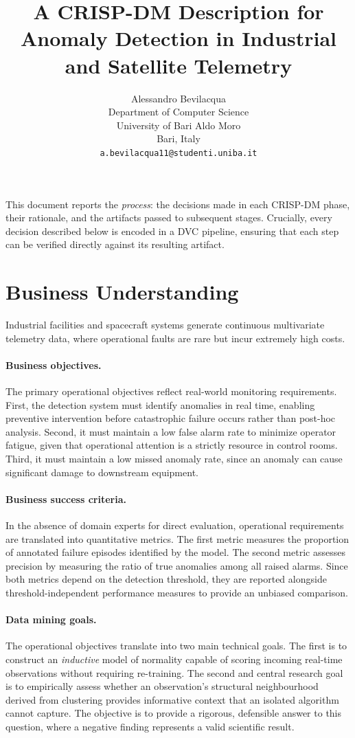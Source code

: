 \documentclass{article}
\title{A CRISP-DM Description for Anomaly Detection in Industrial and Satellite Telemetry}
\author{
 Alessandro Bevilacqua \\
  Department of Computer Science \\
  University of Bari Aldo Moro \\
  Bari, Italy \\
  \texttt{a.bevilacqua11@studenti.uniba.it} \\
}
\begin{document}
\maketitle

This document reports the \emph{process}: the decisions made in each CRISP-DM phase, 
their rationale, and the artifacts passed to subsequent stages. 
Crucially, every decision described below is encoded in a DVC pipeline, ensuring that each step can be verified directly against its resulting artifact.

\section{Business Understanding}

Industrial facilities and spacecraft systems generate continuous multivariate telemetry data, where operational faults are rare but incur extremely high costs.

\paragraph{Business objectives.} 
The primary operational objectives reflect real-world monitoring requirements. 
First, the detection system must identify anomalies in real time, 
enabling preventive intervention before catastrophic failure occurs rather than post-hoc analysis. 
Second, it must maintain a low false alarm rate to minimize operator fatigue, given that operational attention is a strictly 
resource in control rooms. 
Third, it must maintain a low missed anomaly rate, since an anomaly can cause significant damage to downstream equipment.


\paragraph{Business success criteria.} 
In the absence of domain experts for direct evaluation, operational requirements are translated into quantitative metrics.
The first metric measures the proportion of annotated failure episodes identified by the model. 
The second metric assesses precision by measuring the ratio of true anomalies among all raised alarms. 
Since both metrics depend on the detection threshold, they are reported alongside threshold-independent performance measures to provide an unbiased comparison.

\paragraph{Data mining goals.} 
The operational objectives translate into two main technical goals. 
The first is to construct an \emph{inductive} model of normality capable of scoring incoming real-time observations without requiring re-training. 
The second and central research goal is to empirically assess whether an observation's structural neighbourhood derived from clustering provides informative 
context that an isolated algorithm cannot capture. 
The objective is to provide a rigorous, defensible answer to this question,
where a negative finding represents a valid scientific result.
\end{document}
